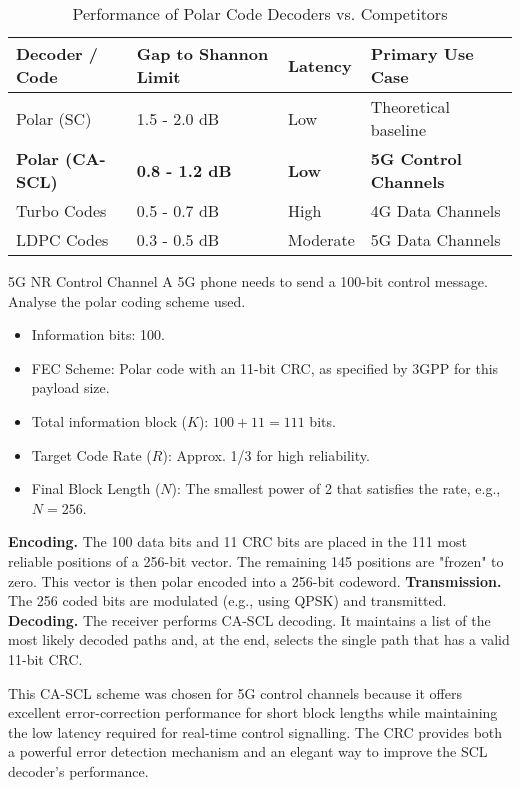 \begin{table}[H]
    \centering
    \caption{Performance of Polar Code Decoders vs. Competitors}
    \label{tab:polar-performance}
    \begin{tabularx}{\textwidth}{@{}XXXX@{}}
        \toprule
        \tableheaderfont Decoder / Code & \tableheaderfont Gap to Shannon Limit & \tableheaderfont Latency & \tableheaderfont Primary Use Case \\
        \midrule
        Polar (SC) & 1.5 - 2.0 dB & Low & Theoretical baseline \\
        \textbf{Polar (CA-SCL)} & \textbf{0.8 - 1.2 dB} & \textbf{Low} & \textbf{5G Control Channels} \\
        Turbo Codes & 0.5 - 0.7 dB & High & 4G Data Channels \\
        LDPC Codes & 0.3 - 0.5 dB & Moderate & 5G Data Channels \\
        \bottomrule
    \end{tabularx}
\end{table}


\begin{workedexample}{5G NR Control Channel}
     A 5G phone needs to send a 100-bit control message. Analyse the polar coding scheme used.
    \begin{itemize}
        \item Information bits: 100.
        \item FEC Scheme: Polar code with an 11-bit CRC, as specified by 3GPP for this payload size.
        \item Total information block ($K$): $100 + 11 = 111$ bits.
        \item Target Code Rate ($R$): Approx. 1/3 for high reliability.
        \item Final Block Length ($N$): The smallest power of 2 that satisfies the rate, e.g., $N=256$.
    \end{itemize}
    \begin{derivationsteps}
        \step \textbf{Encoding.} The 100 data bits and 11 CRC bits are placed in the 111 most reliable positions of a 256-bit vector. The remaining 145 positions are "frozen" to zero. This vector is then polar encoded into a 256-bit codeword.
        \step \textbf{Transmission.} The 256 coded bits are modulated (e.g., using QPSK) and transmitted.
        \step \textbf{Decoding.} The receiver performs CA-SCL decoding. It maintains a list of the most likely decoded paths and, at the end, selects the single path that has a valid 11-bit CRC.
    \end{derivationsteps}
     This CA-SCL scheme was chosen for 5G control channels because it offers excellent error-correction performance for short block lengths while maintaining the low latency required for real-time control signalling. The CRC provides both a powerful error detection mechanism and an elegant way to improve the SCL decoder's performance.
\end{workedexample}


